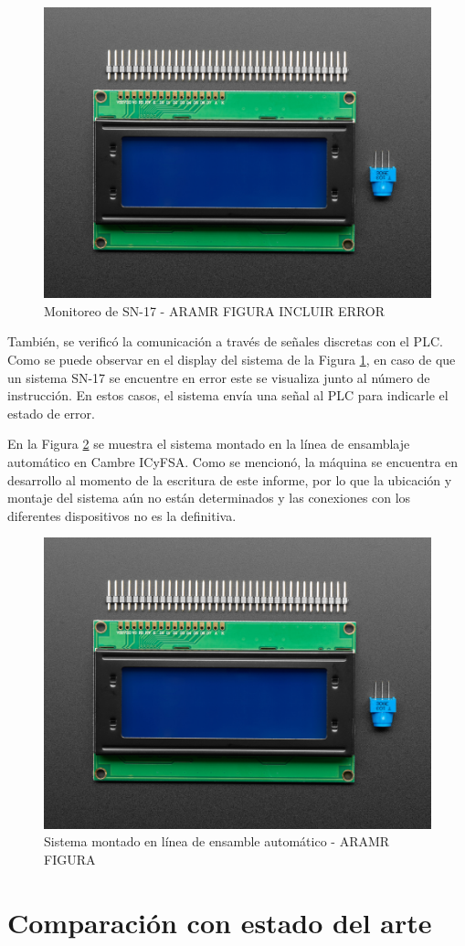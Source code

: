 \begin{figure}[htbp]
	\centering
	\includegraphics[scale=1]{./Figures/LCD.jpg}
	\caption{Monitoreo de SN-17 - ARAMR FIGURA INCLUIR ERROR}
	\label{fig:pantalla_monitoreo}
\end{figure}

También, se verificó la comunicación a través de señales discretas con el PLC. Como se puede observar en el display del sistema de la Figura \ref{fig:pantalla_monitoreo}, en caso de que un sistema SN-17 se encuentre en error este se visualiza junto al número de instrucción. En estos casos, el sistema envía una señal al PLC para indicarle el estado de error.

En la Figura \ref{fig:sistema_en_planta} se muestra el sistema montado en la línea de ensamblaje automático en Cambre ICyFSA. Como se mencionó, la máquina se encuentra en desarrollo al momento de la escritura de este informe, por lo que la ubicación y montaje del sistema aún no están determinados y las conexiones con los diferentes dispositivos no es la definitiva.

\begin{figure}[htbp]
	\centering
	\includegraphics[scale=1]{./Figures/LCD.jpg}
	\caption{Sistema montado en línea de ensamble automático - ARAMR FIGURA}
	\label{fig:sistema_en_planta}
\end{figure}

\section{Comparación con estado del arte}

